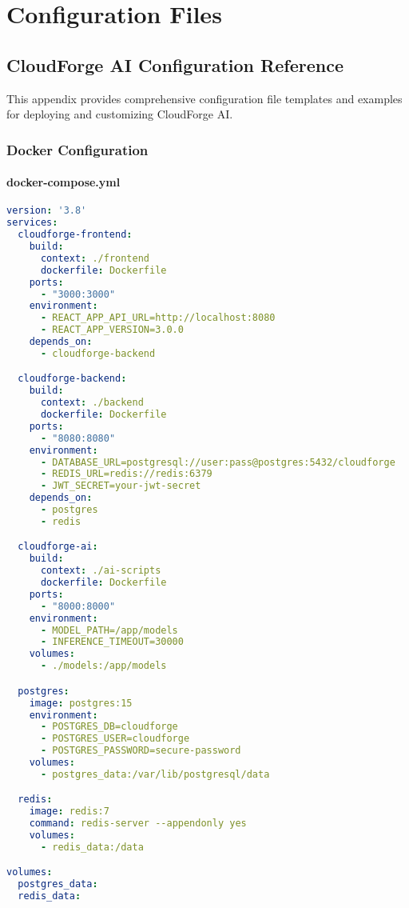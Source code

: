 \chapter{Configuration Files}

\section{CloudForge AI Configuration Reference}

This appendix provides comprehensive configuration file templates and examples for deploying and customizing CloudForge AI.

\subsection{Docker Configuration}

\subsubsection{docker-compose.yml}

\begin{lstlisting}[language=yaml]
version: '3.8'
services:
  cloudforge-frontend:
    build:
      context: ./frontend
      dockerfile: Dockerfile
    ports:
      - "3000:3000"
    environment:
      - REACT_APP_API_URL=http://localhost:8080
      - REACT_APP_VERSION=3.0.0
    depends_on:
      - cloudforge-backend

  cloudforge-backend:
    build:
      context: ./backend
      dockerfile: Dockerfile
    ports:
      - "8080:8080"
    environment:
      - DATABASE_URL=postgresql://user:pass@postgres:5432/cloudforge
      - REDIS_URL=redis://redis:6379
      - JWT_SECRET=your-jwt-secret
    depends_on:
      - postgres
      - redis

  cloudforge-ai:
    build:
      context: ./ai-scripts
      dockerfile: Dockerfile
    ports:
      - "8000:8000"
    environment:
      - MODEL_PATH=/app/models
      - INFERENCE_TIMEOUT=30000
    volumes:
      - ./models:/app/models

  postgres:
    image: postgres:15
    environment:
      - POSTGRES_DB=cloudforge
      - POSTGRES_USER=cloudforge
      - POSTGRES_PASSWORD=secure-password
    volumes:
      - postgres_data:/var/lib/postgresql/data

  redis:
    image: redis:7
    command: redis-server --appendonly yes
    volumes:
      - redis_data:/data

volumes:
  postgres_data:
  redis_data:
\end{lstlisting}

